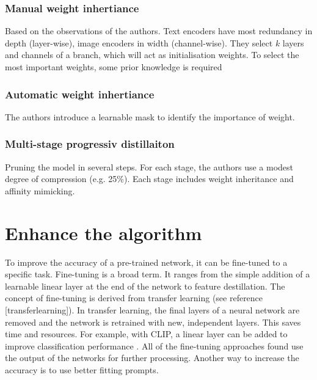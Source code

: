         \subsubsection{Manual weight inhertiance}
        Based on the observations of the authors.
        Text encoders have most redundancy in depth (layer-wise), image encoders in width (channel-wise).
        They select \(k\) layers and channels of a branch, which will act as initialisation weights.
        To select the most important weights, some prior knowledge is required

        \subsubsection{Automatic weight inhertiance}
        The authors introduce a learnable mask to identify the importance of weight.

        \subsubsection{Multi-stage progressiv distillaiton}
        Pruning the model in several steps.
        For each stage, the authors use a modest degree of compression (e.g. 25\%). Each stage includes weight inheritance and affinity mimicking.


\section{Enhance the algorithm}

    To improve the accuracy of a pre-trained network, it can be fine-tuned to a specific task.
    Fine-tuning is a broad term.
    It ranges from the simple addition of a learnable linear layer at the end of the network to feature destillation.
    The concept of fine-tuning is derived from transfer learning (see reference [transferlearning]).
    In transfer learning, the final layers of a neural network are removed and the network is retrained with new, independent layers.
    This saves time and resources.
    For example, with CLIP, a linear layer can be added to improve classification performance \cite{finetuneclip}.
    All of the fine-tuning approaches found use the output of the networks for further processing.
    Another way to increase the accuracy is to use better fitting prompts.


